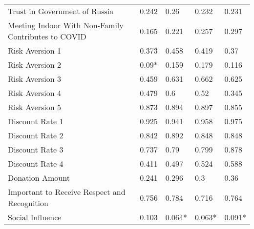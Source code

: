 \begin{table}[ht]
\begin{tabular}{lllll}
  Trust in Government of Russia & 0.242 & 0.26 & 0.232 & 0.231 \\ 
  Meeting Indoor With Non-Family Contributes to COVID & 0.165 & 0.221 & 0.257 & 0.297 \\ 
  Risk Aversion 1 & 0.373 & 0.458 & 0.419 & 0.37 \\ 
  Risk Aversion 2 & 0.09* & 0.159 & 0.179 & 0.116 \\ 
  Risk Aversion 3 & 0.459 & 0.631 & 0.662 & 0.625 \\ 
  Risk Aversion 4 & 0.479 & 0.6 & 0.52 & 0.345 \\ 
  Risk Aversion 5 & 0.873 & 0.894 & 0.897 & 0.855 \\ 
  Discount Rate 1 & 0.925 & 0.941 & 0.958 & 0.975 \\ 
  Discount Rate 2 & 0.842 & 0.892 & 0.848 & 0.848 \\ 
  Discount Rate 3 & 0.737 & 0.79 & 0.799 & 0.878 \\ 
  Discount Rate 4 & 0.411 & 0.497 & 0.524 & 0.588 \\ 
  Donation Amount & 0.241 & 0.296 & 0.3 & 0.36 \\ 
  Important to Receive Respect and Recognition & 0.756 & 0.784 & 0.716 & 0.764 \\ 
  Social Influence & 0.103 & 0.064* & 0.063* & 0.091* \\ 
   \hline
\end{tabular}
\end{table}
